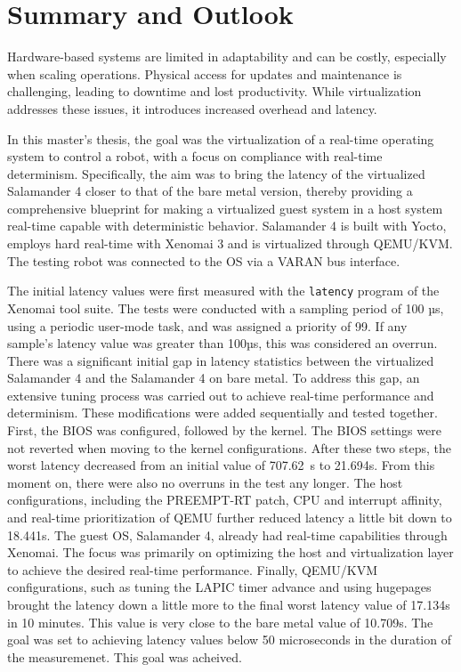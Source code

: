 \documentclass[MMR,Master,english]{twbook}
\begin{document}
\clearpage

\chapter{Summary and Outlook}\label{cha:summary_and_outlook}


Hardware-based systems are limited in adaptability and can be costly, especially when scaling operations. Physical access for updates and maintenance is challenging, leading to downtime and lost productivity. While virtualization addresses these issues, it introduces increased overhead and latency.

\bigskip \noindent In this master's thesis, the goal was the virtualization of a real-time operating system to control a robot, with a focus on compliance with real-time determinism. Specifically, the aim was to bring the latency of the virtualized Salamander 4 closer to that of the bare metal version, thereby providing a comprehensive blueprint for making a virtualized guest system in a host system real-time capable with deterministic behavior. Salamander 4 is built with Yocto, employs hard real-time with Xenomai 3 and is virtualized through QEMU/KVM. The testing robot was connected to the OS via a VARAN bus interface.

\bigskip \noindent The initial latency values were first measured with the \texttt{latency} program of the Xenomai tool suite. The tests were conducted with a sampling period of 100 µs, using a periodic user-mode task, and was assigned a priority of 99. If any sample's latency value was greater than 100µs, this was considered an overrun. There was a significant initial gap in latency statistics between the virtualized Salamander 4 and the Salamander 4 on bare metal. To address this gap, an extensive tuning process was carried out to achieve real-time performance and determinism. These modifications were added sequentially and tested together. First, the BIOS was configured, followed by the kernel. The BIOS settings were not reverted when moving to the kernel configurations. After these two steps, the worst latency decreased from an initial value of 707.62~\textmu s to 21.694\textmu s.  From this moment on, there were also no overruns in the test any longer. The host configurations, including the PREEMPT-RT patch, CPU and interrupt affinity, and real-time prioritization of QEMU further reduced latency a little bit down to 18.441\textmu s. The guest OS, Salamander 4, already had real-time capabilities through Xenomai. The focus was primarily on optimizing the host and virtualization layer to achieve the desired real-time performance. Finally, QEMU/KVM configurations, such as tuning the LAPIC timer advance and using hugepages brought the latency down a little more to the final worst latency value of 17.134\textmu s in 10 minutes. This value is very close to the bare metal value of 10.709\textmu s. The goal was set to achieving latency values below 50 microseconds in the duration of the measuremenet. This goal was acheived.
\end{document}
